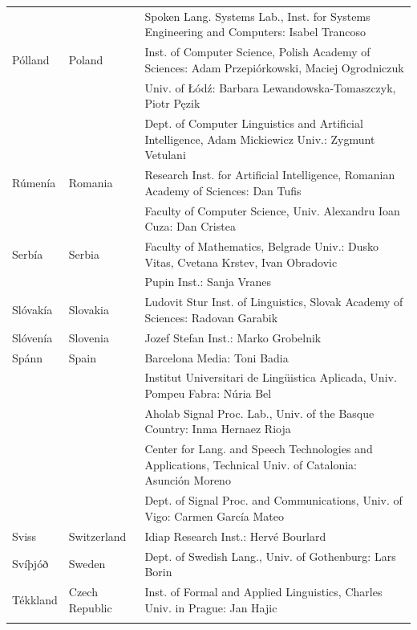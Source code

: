 \documentclass{../../metanetpaper}
\begin{document}
\begin{longtable}{llp{105mm}}
  & & Spoken Lang. Systems Lab., Inst. for Systems Engineering and Computers: Isabel Trancoso \\ \addlinespace
  Pólland & \textcolor{grey1}{Poland} & Inst. of Computer Science, Polish Academy of Sciences: Adam Przepiórkowski, Maciej Ogrodniczuk \\ \addlinespace
  & & Univ. of Łódź: Barbara Lewandowska-Tomaszczyk, Piotr Pęzik\\ \addlinespace
  & & Dept. of Computer Linguistics and Artificial Intelligence, Adam Mickiewicz Univ.: Zygmunt Vetulani \\ \addlinespace
  Rúmenía & \textcolor{grey1}{Romania} & Research Inst. for Artificial Intelligence, Romanian Academy of Sciences: Dan Tufis \\ \addlinespace
  & & Faculty of Computer Science, Univ. Alexandru Ioan Cuza: Dan Cristea \\ \addlinespace
  Serbía & \textcolor{grey1}{Serbia} & Faculty of Mathematics, Belgrade Univ.: Dusko Vitas, Cvetana Krstev, Ivan Obradovic \\ \addlinespace
  & & Pupin Inst.: Sanja Vranes \\ \addlinespace  
  Slóvakía & \textcolor{grey1}{Slovakia} & Ludovit Stur Inst. of Linguistics, Slovak Academy of Sciences: Radovan Garabik \\ \addlinespace 
  Slóvenía & \textcolor{grey1}{Slovenia} & Jozef Stefan Inst.: Marko Grobelnik \\ \addlinespace 
  Spánn & \textcolor{grey1}{Spain} & Barcelona Media: Toni Badia \\ \addlinespace 
  & & Institut Universitari de Lingüistica Aplicada, Univ. Pompeu Fabra: Núria Bel \\ \addlinespace 
  & & Aholab Signal Proc. Lab., Univ. of the Basque Country: Inma Hernaez Rioja \\ \addlinespace 
  & & Center for Lang. and Speech Technologies and Applications, Technical Univ. of Catalonia: Asunción Moreno \\ \addlinespace 
  & & Dept. of Signal Proc. and Communications, Univ. of Vigo: Carmen García Mateo \\ \addlinespace 
  Sviss & \textcolor{grey1}{Switzerland} & Idiap Research Inst.: Hervé Bourlard \\ \addlinespace 
  Svíþjóð & \textcolor{grey1}{Sweden} & Dept. of Swedish Lang., Univ. of Gothenburg: Lars Borin \\ \addlinespace 
  Tékkland & \textcolor{grey1}{Czech Republic} & Inst. of Formal and Applied Linguistics, Charles Univ. in Prague: Jan Hajic \\ \addlinespace

\end{longtable}
\end{document}
